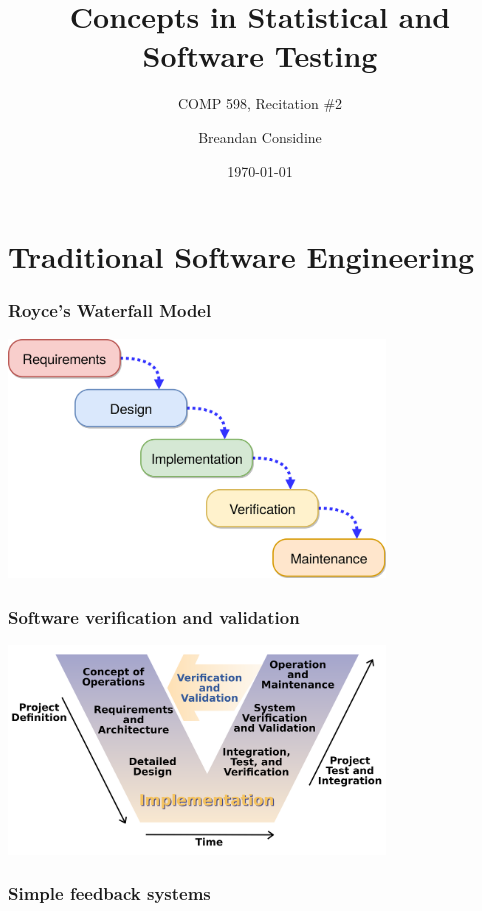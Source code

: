 \documentclass{beamer}
\title{Concepts in Statistical and Software Testing}
\subtitle{COMP 598, Recitation \#2}
\author{Breandan Considine}
\institute[McGill]{
McGill University \\
\medskip
\textit{breandan.considine@mcgill.ca}
}
\date{\today}
\begin{document}
\begin{frame}
    \titlepage
\end{frame}


\section{Traditional Software Engineering}

\begin{frame}
\frametitle{Royce's Waterfall Model}
\center\includegraphics[width=0.75\textwidth]{../figures/waterfall_diagram.png}
\end{frame}

\begin{frame}
\frametitle{Software verification and validation}
\center\includegraphics[width=0.75\textwidth]{../figures/verification_validation.png}
\end{frame}

\begin{frame}
\frametitle{Simple feedback systems}
\vspace{-0.8cm}
\center{}
\end{frame}
\end{document}
